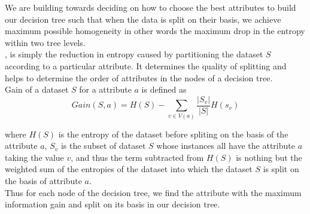 We are building towards deciding on how to choose the best attributes to build our decision tree such that when the data is split on their basis, we achieve maximum possible homogeneity in other words the maximum drop in the entropy within two tree levels. \\

, is simply the reduction in entropy caused by partitioning the dataset $S$ according to a particular attribute.
It determines the quality of splitting and helps to determine the order of attributes in the nodes of a decision tree. \\

Gain of a dataset $S$ for a attribute $a$ is defined as
$$
  Gain(S,a) =  H(S) -\sum_{v \in V(a)}\frac{|S_v|}{|S|} H(s_v)
$$

where $H(S)$ is the entropy of the dataset before spliting on the basis of the attribute $a$, $S_v$ is the subset of dataset $S$ whose instances all have the attribute $a$ taking the value $v$, and thus the term subtracted from $H(S)$ is nothing but the weighted sum of the entropies of the dataset into which the dataset $S$ is split on the basis of attribute $a$. \\

Thus for each node of the decision tree, we find the attribute with the maximum information gain and split on its basis in our decision tree.
